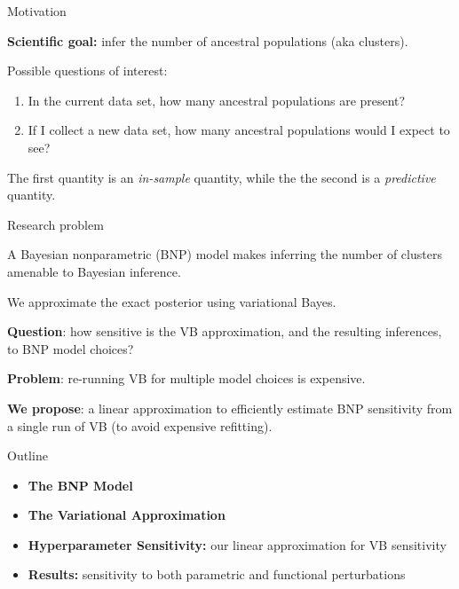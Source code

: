 \begin{frame}{Motivation}

{\bf Scientific goal: } infer the number of ancestral populations (aka clusters).

\pause
Possible questions of interest:
\begin{enumerate}
    \item In the current data set, how many ancestral populations are present?
    \pause
    \item If I collect a new data set, how many ancestral populations would I expect to see?
\end{enumerate}

\pause

The first quantity is an {\itshape in-sample} quantity, while the the second is a {\itshape predictive} quantity.

\end{frame}
\begin{frame}{Research problem}

A Bayesian nonparametric (BNP) model makes inferring the number of clusters amenable to
Bayesian inference.

\pause

We approximate the exact posterior using variational Bayes.

\pause

\textbf{Question}: how sensitive is the VB approximation, and the resulting
inferences, to BNP model choices?

\pause

\textbf{Problem}: re-running VB for multiple model choices is expensive.

\pause

\textbf{We propose}: a linear approximation to efficiently
estimate BNP sensitivity from a single run of VB (to avoid
expensive refitting).

\end{frame}

\begin{frame}{Outline}
\begin{itemize}
\item {\bf The BNP Model}
\vspace{0.1in}

\item {\bf The Variational Approximation}
\vspace{0.1in}

\item {\bf Hyperparameter Sensitivity:} our linear approximation for VB sensitivity
\vspace{0.1in}

\item {\bf Results:} sensitivity to both parametric and functional perturbations
\vspace{0.1in}

\end{itemize}
\end{frame}
